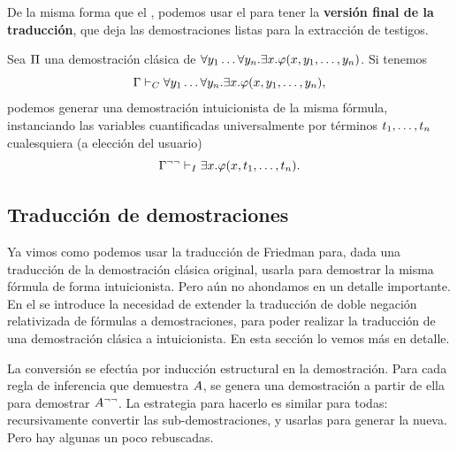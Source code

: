\begin{corollary}
    \label{fri:cor:forall-inst}
    De la misma forma que el , podemos usar el  para tener la \textbf{versión final de la traducción}, que deja las demostraciones listas para la extracción de testigos.

    Sea $\Pi$ una demostración clásica de \(
    \forall y_1 \dots \forall y_n .
    \exists x .
    \varphi(x, y_1, \dots, y_n)
    \). Si tenemos
    \[
        \Gamma \vdash_C
        \forall y_1 \dots \forall y_n .
        \exists x .
        \varphi(x, y_1, \dots, y_n),
    \]
    podemos generar una demostración intuicionista de la misma fórmula, instanciando las variables cuantificadas universalmente por términos $t_1, \dots, t_n$ cualesquiera (a elección del usuario)
    \[
        \Gamma^{\neg\neg} \vdash_I
        \exists x .
        \varphi(x, t_1, \dots, t_n).
    \]
\end{corollary}

\subsection{Traducción de demostraciones}
\label{fri:sec:proof-trans}

Ya vimos como podemos usar la traducción de Friedman para, dada una traducción de la demostración clásica original, usarla para demostrar la misma fórmula de forma intuicionista. Pero aún no ahondamos en un detalle importante. En el  se introduce la necesidad de extender la traducción de doble negación relativizada de fórmulas a demostraciones, para poder realizar la traducción de una demostración clásica a intuicionista. En esta sección lo vemos más en detalle.

La conversión se efectúa por inducción estructural en la demostración. Para cada regla de inferencia que demuestra $A$, se genera una demostración a partir de ella para demostrar $A^{\neg\neg}$. La estrategia para hacerlo es similar para todas: recursivamente convertir las sub-demostraciones, y usarlas para generar la nueva. Pero hay algunas un poco rebuscadas.

